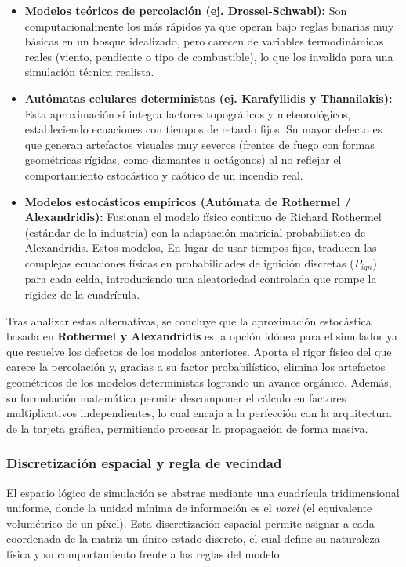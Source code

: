         \begin{itemize}
            \item \textbf{Modelos teóricos de percolación (ej. Drossel-Schwabl):} Son computacionalmente los más rápidos ya que operan bajo reglas binarias muy básicas en un bosque idealizado, pero carecen de variables termodinámicas reales (viento, pendiente o tipo de combustible), lo que los invalida para una simulación técnica realista\cite{percolacion}. 
            
            \item \textbf{Autómatas celulares deterministas (ej. Karafyllidis y Thanailakis):} Esta aproximación sí integra factores topográficos y meteorológicos, estableciendo ecuaciones con tiempos de retardo fijos. Su mayor defecto es que generan artefactos visuales muy severos (frentes de fuego con formas geométricas rígidas, como diamantes u octágonos) al no reflejar el comportamiento estocástico y caótico de un incendio real\cite{deterministas}. 
    
            \item \textbf{Modelos estocásticos empíricos (Autómata de Rothermel / Alexandridis):} Fusionan el modelo físico continuo de Richard Rothermel (estándar de la industria) con la adaptación matricial probabilística de Alexandridis. Estos modelos, En lugar de usar tiempos fijos, traducen las complejas ecuaciones físicas en probabilidades de ignición discretas ($P_{ign}$) para cada celda, introduciendo una aleatoriedad controlada que rompe la rigidez de la cuadrícula. 
        \end{itemize}

        Tras analizar estas alternativas, se concluye que la aproximación estocástica basada en \textbf{Rothermel y Alexandridis} es la opción idónea para el simulador ya que  resuelve los defectos de los modelos anteriores. Aporta el rigor físico del que carece la percolación y, gracias a su factor probabilístico, elimina los artefactos geométricos de los modelos deterministas logrando un avance orgánico. Además, su formulación matemática permite descomponer el cálculo en factores multiplicativos independientes, lo cual encaja a la perfección con la arquitectura de la tarjeta gráfica, permitiendo procesar la propagación de forma masiva.\\

        \subsubsection*{Discretización espacial y regla de vecindad}
            El espacio lógico de simulación se abstrae mediante una cuadrícula tridimensional uniforme, donde la unidad mínima de información es el \textit{voxel} (el equivalente volumétrico de un píxel). Esta discretización espacial permite asignar a cada coordenada de la matriz un único estado discreto, el cual define su naturaleza física y su comportamiento frente a las reglas del modelo. \\
        
